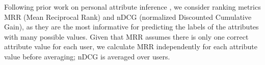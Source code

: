 
Following prior work on personal attribute inference \cite{tigunova:ham:2019,pietro:ACL15}, we consider ranking metrics MRR (Mean Reciprocal Rank) and nDCG (normalized Discounted Cumulative Gain), as they are the most informative for predicting the labels of the attributes with many possible values.
Given that MRR assumes there is only one correct attribute value for each user, we calculate MRR independently for each attribute value before averaging; nDCG is averaged over users.

